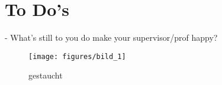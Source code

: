 \section{To Do's}





- What's still to you do make your supervisor/prof happy?

\begin{figure}[ht]
	\centering
  \texttt{[image: figures/bild\_1]}
	\caption{gestaucht}
	\label{lbl_bild_1}
\end{figure}




\pagebreak




